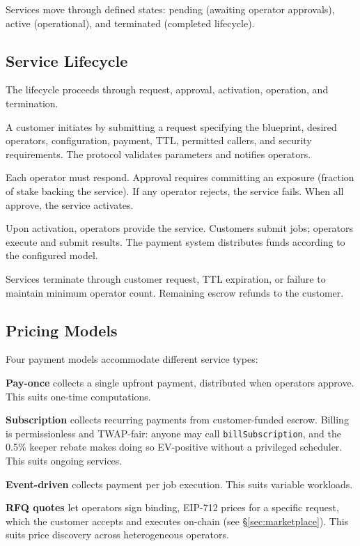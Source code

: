 \documentclass[11pt,a4paper]{article}
\begin{document}
Services move through defined states: pending (awaiting operator approvals), active (operational), and terminated (completed lifecycle).

\subsection{Service Lifecycle}

The lifecycle proceeds through request, approval, activation, operation, and termination.

A customer initiates by submitting a request specifying the blueprint, desired operators, configuration, payment, TTL, permitted callers, and security requirements. The protocol validates parameters and notifies operators.

Each operator must respond. Approval requires committing an exposure (fraction of stake backing the service). If any operator rejects, the service fails. When all approve, the service activates.

Upon activation, operators provide the service. Customers submit jobs; operators execute and submit results. The payment system distributes funds according to the configured model.

Services terminate through customer request, TTL expiration, or failure to maintain minimum operator count. Remaining escrow refunds to the customer.

\subsection{Pricing Models}

Four payment models accommodate different service types:

\textbf{Pay-once} collects a single upfront payment, distributed when operators approve. This suits one-time computations.

\textbf{Subscription} collects recurring payments from customer-funded escrow. Billing is permissionless and TWAP-fair: anyone may call \texttt{billSubscription}, and the 0.5\% keeper rebate makes doing so EV-positive without a privileged scheduler. This suits ongoing services.

\textbf{Event-driven} collects payment per job execution. This suits variable workloads.

\textbf{RFQ quotes} let operators sign binding, EIP-712 prices for a specific request, which the customer accepts and executes on-chain (see \S\ref{sec:marketplace}). This suits price discovery across heterogeneous operators.
\end{document}
